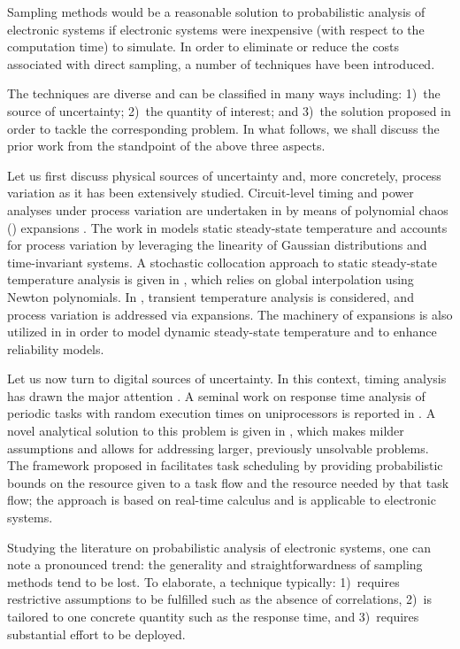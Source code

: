 Sampling methods would be a reasonable solution to probabilistic analysis of
electronic systems if electronic systems were inexpensive (with respect to the
computation time) to simulate. In order to eliminate or reduce the costs
associated with direct sampling, a number of techniques have been introduced.

The techniques are diverse and can be classified in many ways including: 1)~the
source of uncertainty; 2)~the quantity of interest; and 3)~the solution proposed
in order to tackle the corresponding problem. In what follows, we shall discuss
the prior work from the standpoint of the above three aspects.

Let us first discuss physical sources of uncertainty and, more concretely,
process variation as it has been extensively studied. Circuit-level timing and
power analyses under process variation are undertaken in \cite{bhardwaj2008} by
means of polynomial chaos () expansions \cite{xiu2010}. The work in
\cite{juan2012} models static steady-state temperature and accounts for process
variation by leveraging the linearity of Gaussian distributions and
time-invariant systems. A stochastic collocation \cite{xiu2010} approach to
static steady-state temperature analysis is given in \cite{lee2013}, which
relies on global interpolation using Newton polynomials. In \cite{ukhov2014},
transient temperature analysis is considered, and process variation is addressed
via  expansions. The machinery of  expansions is also utilized in
\cite{ukhov2015} in order to model dynamic steady-state temperature
\cite{ukhov2012} and to enhance reliability models.

Let us now turn to digital sources of uncertainty. In this context, timing
analysis has drawn the major attention \cite{quinton2012}. A seminal work on
response time analysis of periodic tasks with random execution times on
uniprocessors is reported in \cite{diaz2002}. A novel analytical solution to
this problem is given in \cite{tanasa2015}, which makes milder assumptions and
allows for addressing larger, previously unsolvable problems. The framework
proposed in \cite{santinelli2011} facilitates task scheduling by providing
probabilistic bounds on the resource given to a task flow and the resource
needed by that task flow; the approach is based on real-time calculus and is
applicable to electronic systems.

Studying the literature on probabilistic analysis of electronic systems, one can
note a pronounced trend: the generality and straightforwardness of sampling
methods tend to be lost. To elaborate, a technique typically: 1)~requires
restrictive assumptions to be fulfilled such as the absence of correlations,
2)~is tailored to one concrete quantity such as the response time, and
3)~requires substantial effort to be deployed.

